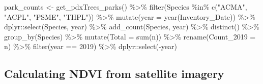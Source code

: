 \documentclass[12pt,twoside]{reedthesis}
\newenvironment{Shaded}{\begin{snugshade}}{\end{snugshade}}
\newcommand{\AttributeTok}[1]{\textcolor[rgb]{0.77,0.63,0.00}{#1}}
\newcommand{\DecValTok}[1]{\textcolor[rgb]{0.00,0.00,0.81}{#1}}
\newcommand{\FunctionTok}[1]{\textcolor[rgb]{0.00,0.00,0.00}{#1}}
\newcommand{\NormalTok}[1]{#1}
\newcommand{\OtherTok}[1]{\textcolor[rgb]{0.56,0.35,0.01}{#1}}
\newcommand{\SpecialCharTok}[1]{\textcolor[rgb]{0.00,0.00,0.00}{#1}}
\newcommand{\StringTok}[1]{\textcolor[rgb]{0.31,0.60,0.02}{#1}}
\begin{document}
\begin{Shaded}
\begin{Highlighting}[]
\NormalTok{park\_counts }\OtherTok{\textless{}{-}} \FunctionTok{get\_pdxTrees\_parks}\NormalTok{() }\SpecialCharTok{\%\textgreater{}\%}
    \FunctionTok{filter}\NormalTok{(Species }\SpecialCharTok{\%in\%} \FunctionTok{c}\NormalTok{(}\StringTok{"ACMA"}\NormalTok{, }\StringTok{"ACPL"}\NormalTok{, }\StringTok{"PSME"}\NormalTok{, }\StringTok{"THPL"}\NormalTok{)) }\SpecialCharTok{\%\textgreater{}\%}
    \FunctionTok{mutate}\NormalTok{(}\AttributeTok{year =} \FunctionTok{year}\NormalTok{(Inventory\_Date)) }\SpecialCharTok{\%\textgreater{}\%}
\NormalTok{    dplyr}\SpecialCharTok{::}\FunctionTok{select}\NormalTok{(Species, year) }\SpecialCharTok{\%\textgreater{}\%}
    \FunctionTok{add\_count}\NormalTok{(Species, year) }\SpecialCharTok{\%\textgreater{}\%}
    \FunctionTok{distinct}\NormalTok{() }\SpecialCharTok{\%\textgreater{}\%}
    \FunctionTok{group\_by}\NormalTok{(Species) }\SpecialCharTok{\%\textgreater{}\%}
    \FunctionTok{mutate}\NormalTok{(}\AttributeTok{Total =} \FunctionTok{sum}\NormalTok{(n)) }\SpecialCharTok{\%\textgreater{}\%}
    \FunctionTok{rename}\NormalTok{(}\AttributeTok{Count\_2019 =}\NormalTok{ n) }\SpecialCharTok{\%\textgreater{}\%}
    \FunctionTok{filter}\NormalTok{(year }\SpecialCharTok{==} \DecValTok{2019}\NormalTok{) }\SpecialCharTok{\%\textgreater{}\%}
\NormalTok{    dplyr}\SpecialCharTok{::}\FunctionTok{select}\NormalTok{(}\SpecialCharTok{{-}}\NormalTok{year)}
\end{Highlighting}
\end{Shaded}
\hypertarget{calculating-ndvi-from-satellite-imagery}{%
\subsection*{Calculating NDVI from satellite imagery}\label{calculating-ndvi-from-satellite-imagery}}
\end{document}
